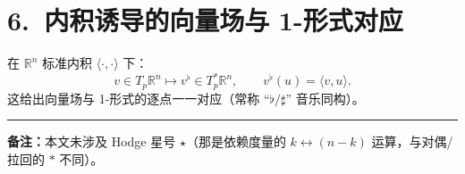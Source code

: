 \documentclass[11pt,a4paper]{article}
\newcommand{\R}{\mathbb{R}}
\begin{document}
\section*{6.\ 内积诱导的向量场与 1-形式对应}
在 $\R^n$ 标准内积 $\langle\cdot,\cdot\rangle$ 下：
\[
v\in T_p\R^n \longmapsto v^\flat\in T_p^*\R^n,\qquad
v^\flat(u)=\langle v,u\rangle.
\]
这给出向量场与 1-形式的逐点一一对应（常称 ``$\flat/\sharp$'' 音乐同构）。

\vspace{0.6em}
\hrule
\vspace{0.6em}
\noindent\textbf{备注：}本文未涉及 Hodge 星号 $\star$（那是依赖度量的 $k\leftrightarrow (n-k)$ 运算，与对偶/拉回的 $*$ 不同）。
\end{document}
